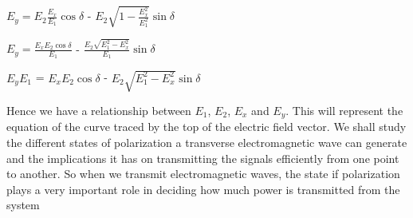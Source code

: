  $E_y = E_{2}\frac{E_x}{E_{1}}\cos\delta$ - $E_{2}\sqrt{1 - \frac{E_x^2}{E_{1}^2}}\sin\delta$

$E_y = \frac{E_xE_{2}\cos\delta}{E_{1}}$ - $\frac{E_{2}\sqrt{E_{1}^2 - E_x^2}}{E_{1}}\sin\delta$

$E_yE_{1}$ = $E_xE_{2}\cos\delta$ - $E_{2}\sqrt{E_{1}^2 - E_x^2}\sin\delta$

Hence we have a relationship between $E_{1}$, $E_{2}$, $E_x$ and $E_y$. This will represent the equation of the curve traced by the top of the electric field vector. We shall study the different states of polarization a transverse electromagnetic wave can generate and the implications it has on transmitting the signals efficiently from one point to another. So when we transmit electromagnetic waves, the state if polarization plays a very important role in deciding how much power is transmitted from the system	
